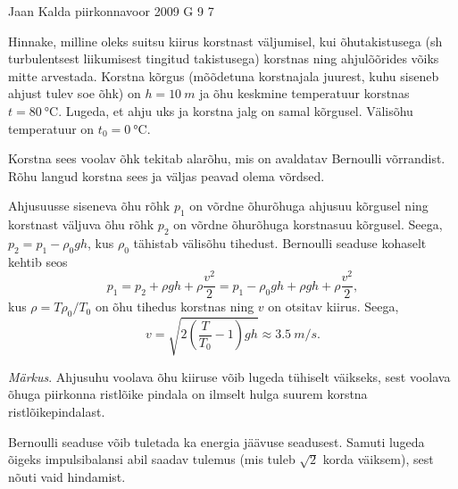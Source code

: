 {Jaan Kalda} %
{piirkonnavoor} %
{2009} %
{G 9} %
{7} %
{
\ifStatement
Hinnake, milline oleks suitsu kiirus korstnast väljumisel, kui õhutakistusega (sh turbulentsest liikumisest tingitud takistusega) korstnas ning ahjulõõrides võiks mitte arvestada.
Korstna kõrgus (mõõdetuna korstnajala juurest, kuhu siseneb ahjust tulev soe õhk) on $h=\SI{10}{m}$ ja õhu keskmine temperatuur korstnas $t=\SI{80}{\celsius}$. Lugeda, et ahju uks ja korstna jalg on samal kõrgusel. Välisõhu temperatuur on $t_0=\SI{0}{\celsius}$.
\fi


\ifHint
Korstna sees voolav õhk tekitab alarõhu, mis on avaldatav Bernoulli võrrandist. Rõhu langud korstna sees ja väljas peavad olema võrdsed.
\fi


\ifSolution
Ahjusuusse siseneva õhu rõhk $p_1$ on võrdne õhurõhuga ahjusuu kõrgusel ning korstnast väljuva õhu rõhk $p_2$ on võrdne õhurõhuga korstnasuu kõrgusel. Seega, $p_2=p_1-\rho_0 gh$, kus $\rho_0$ tähistab välisõhu tihedust. Bernoulli seaduse kohaselt kehtib seos 
\[
p_1=p_2 + \rho gh + \rho \frac{v^2}{2} = p_1 - \rho_0 gh + \rho gh+\rho \frac{v^2}{2},
\]
kus $\rho=T\rho_0/T_0$ on õhu tihedus korstnas ning $v$ on otsitav kiirus. Seega,
\[
v=\sqrt {2\left(\frac T{T_0}-1\right)gh}\approx \SI{3,5}{m/s}.
\]

\emph{Märkus}. Ahjusuhu voolava õhu kiiruse võib lugeda tühiselt väikseks, sest voolava õhuga piirkonna ristlõike pindala on ilmselt hulga suurem korstna ristlõikepindalast.


Bernoulli seaduse võib tuletada ka energia jäävuse seadusest. Samuti lugeda õigeks impulsibalansi abil saadav tulemus (mis tuleb $\sqrt 2$ korda väiksem), sest nõuti vaid hindamist.
\fi
}